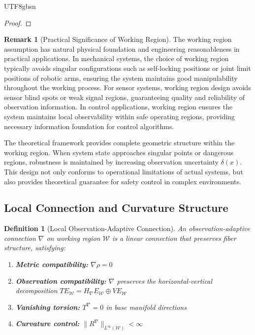\documentclass[a4paper,12pt]{extarticle}
\newtheorem{definition}{Definition}
\theoremstyle{definition}
\newtheorem{remark}{Remark}
\begin{document}
\begin{CJK}{UTF8}{gbsn}
\begin{proof}
\end{proof}

\begin{remark}[Practical Significance of Working Region]
The working region assumption has natural physical foundation and engineering reasonableness in practical applications. In mechanical systems, the choice of working region typically avoids singular configurations such as self-locking positions or joint limit positions of robotic arms, ensuring the system maintains good manipulability throughout the working process. For sensor systems, working region design avoids sensor blind spots or weak signal regions, guaranteeing quality and reliability of observation information. In control applications, working region ensures the system maintains local observability within safe operating regions, providing necessary information foundation for control algorithms.

The theoretical framework provides complete geometric structure within the working region. When system state approaches singular points or dangerous regions, robustness is maintained by increasing observation uncertainty $\delta(x)$. This design not only conforms to operational limitations of actual systems, but also provides theoretical guarantee for safety control in complex environments.
\end{remark}



\subsection{Local Connection and Curvature Structure}\label{subsec:local_connection}

\begin{definition}[Local Observation-Adaptive Connection]
An observation-adaptive connection $\nabla$ on working region $\mathcal{W}$ is a linear connection that preserves fiber structure, satisfying:
\begin{enumerate}[label=(\arabic*)]
\item \textbf{Metric compatibility:} $\nabla\rho = 0$
\item \textbf{Observation compatibility:} $\nabla$ preserves the horizontal-vertical decomposition $TE_{\mathcal{W}} = H_\nabla E_{\mathcal{W}} \oplus V E_{\mathcal{W}}$
\item \textbf{Vanishing torsion:} $T^\nabla = 0$ in base manifold directions
\item \textbf{Curvature control:} $\|R^\nabla\|_{L^\infty(\mathcal{W})} < \infty$
\end{enumerate}
\end{definition}


\end{CJK}
\end{document}
